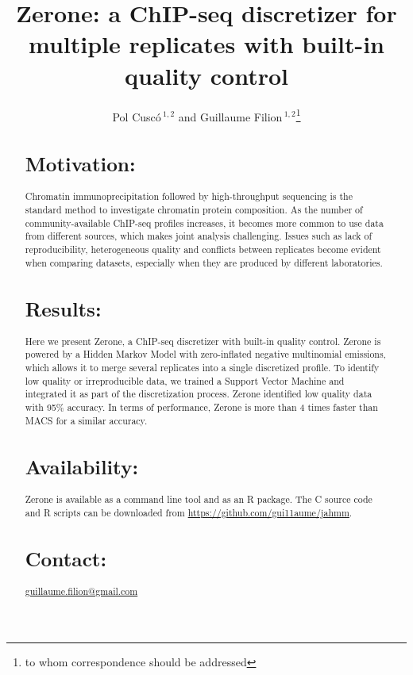 \documentclass{bioinfo}
\begin{document}

\title[Combined ChIP-seq discretization and quality control]{Zerone:
a ChIP-seq discretizer for multiple replicates with built-in quality control}
\author[Cusc\'o \textit{et~al}]{Pol Cusc\'o\,$^{1,2}$ and Guillaume
Filion\,$^{1,2}$\footnote{to whom correspondence should be addressed}}
\address{$^{1}$Genome Architecture, Gene Regulation, Stem Cells and Cancer
Programme, Centre for Genomic Regulation (CRG), Dr. Aiguader 88, 08003
Barcelona, Spain.\\
$^{2}$Universitat Pompeu Fabra (UPF), Barcelona, Spain.}



\maketitle

\begin{abstract}

\section{Motivation:}
Chromatin immunoprecipitation followed by high-throughput sequencing
is the standard method to investigate chromatin protein composition. As the
number of community-available ChIP-seq profiles increases, it becomes more
common to use data from different sources, which makes joint analysis
challenging. Issues such as lack of reproducibility, heterogeneous quality and
conflicts between replicates become evident when comparing datasets, especially
when they are produced by different laboratories.

\section{Results:}
Here we present Zerone, a ChIP-seq discretizer with built-in quality control.
Zerone is powered by a Hidden Markov Model with zero-inflated negative
multinomial emissions, which allows it to merge several replicates into a single
discretized profile. To identify low quality or irreproducible data, we trained
a Support Vector Machine and integrated it as part of the discretization
process. Zerone identified low quality data with 95\% accuracy. In terms of
performance, Zerone is more than 4 times faster than MACS for a similar
accuracy.

\section{Availability:}
Zerone is available as a command line tool and as an R package. The C
source code and R scripts can be downloaded from
\href{https://github.com/gui11aume/jahmm}{https://github.com/gui11aume/jahmm}.

\section{Contact:}
\href{guillaume.filion@gmail.com}{guillaume.filion@gmail.com}
\end{abstract}
\end{document}
